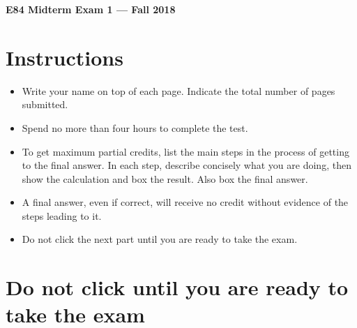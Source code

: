 \usepackage{html}


\begin{center}
{\Large \bf  E84 Midterm Exam 1 --- Fall 2018}
\end{center}

\section*{\bf Instructions}

\begin{itemize}
\item Write your name on top of each page. Indicate the total number
  of pages submitted.
\item Spend no more than four hours to complete the test.
\item To get maximum partial credits, list the main steps in the 
  process of getting to the final answer. In each step, describe 
  concisely what you are doing, then show the calculation and box 
  the result. Also box the final answer.
\item A final answer, even if correct, will receive no credit
  without evidence of the steps leading to it.
\item Do not click the next part until you are ready to take the exam.
\end{itemize}

\section*{\bf Do not click until you are ready to take the exam}


